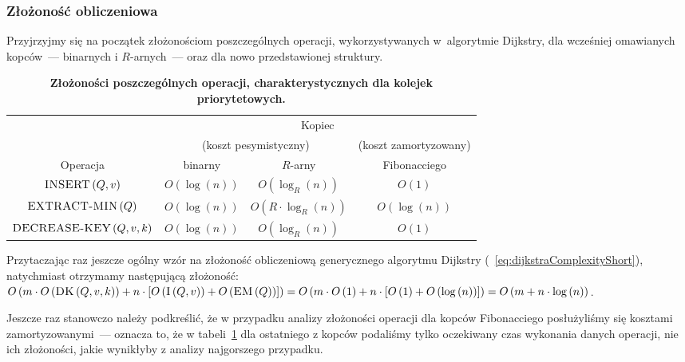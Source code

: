 \subsubsection{Złożoność obliczeniowa}


Przyjrzyjmy się na początek złożonościom poszczególnych operacji, wykorzystywanych w~algorytmie Dijkstry, dla wcześniej omawianych kopców~--- binarnych i $R$-arnych~--- oraz dla nowo przedstawionej struktury.

\begin{table}[!h]
	\null\hfill
	\begin{tabular}{cccc}
		& \multicolumn{3}{c}{Kopiec} \\
		\cline{2-4}
		& \multicolumn{2}{c}{\small{(koszt pesymistyczny)}} & \small{(koszt zamortyzowany)} \\
		\cline{2-4}
		Operacja & binarny & $R$-arny & Fibonacciego \\
		\hline
		$\textrm{\textsc{INSERT}} \left( Q, v \right)$ & $O \left( \log \left( n \right) \right)$ & $O \left( \log_{R} \left( n \right) \right)$ & $ O \left( 1 \right)$ \\
		$\textrm{\textsc{EXTRACT-MIN}} \left( Q \right)$ & $O \left( \log \left( n \right) \right)$ & $O \left( R \cdot \log_{R} \left( n \right) \right)$ & $O \left( \log \left( n \right) \right)$ \\
		$\textrm{\textsc{DECREASE-KEY}} \left( Q, v, k \right)$ & $O \left( \log \left( n \right) \right)$ & $O \left( \log_{R} \left( n \right) \right)$ & $ O \left( 1 \right)$ \\
		\hline
	\end{tabular}
	\hfill\null
	\caption{
		\textbf{Złożoności poszczególnych operacji, charakterystycznych dla kolejek priorytetowych.}
	}
	\label{tab:priorityQueueComplexity}
\end{table}

Przytaczając raz jeszcze ogólny wzór na złożoność obliczeniową generycznego algorytmu Dijkstry (~\ref{eq:dijkstraComplexityShort}), natychmiast otrzymamy następującą złożoność: $O \left( m \cdot O \left( \textrm{\textsc{DK}} \left( Q, v, k \right) \right) + n \cdot \left[ O \left( \textrm{\textsc{I}} \left( Q, v \right) \right) + O \left( \textrm{\textsc{EM}} \left( Q \right) \right) \right] \right) = O \left( m \cdot O \left( 1 \right) + n \cdot \left[ O \left( 1 \right) + O \left( \log \left( n \right) \right) \right] \right) = O \left( m + n \cdot \log \left( n \right) \right)$.

Jeszcze raz stanowczo należy podkreślić, że w przypadku analizy złożoności operacji dla kopców Fibonacciego posłużyliśmy się kosztami zamortyzowanymi~--- oznacza to, że w tabeli~\ref{tab:priorityQueueComplexity} dla ostatniego z kopców podaliśmy tylko oczekiwany czas wykonania danych operacji, nie ich złożoności, jakie wynikłyby z analizy najgorszego przypadku.




